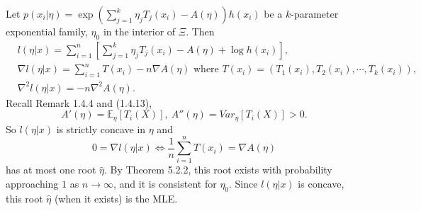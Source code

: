 \documentclass[a4paper]{article}
\begin{document}
\begin{eg}
	Let $p(x_i|\eta) = \exp(\sum\limits_{j=1}^k \eta_j T_j(x_i) - A(\eta)) h(x_i)$ be a $k$-parameter exponential family, $\eta_0$ in the interior of $\Xi$. Then
	\begin{equation*}
		\begin{aligned}
			& l(\eta|x) = \sum\limits_{i=1}^n\left[\sum\limits_{j=1}^k \eta_j T_j(x_i) - A(\eta) + \log h(x_i)\right], \\
			& \nabla l(\eta|x) = \sum\limits_{i=1}^n T(x_i) - n \nabla A(\eta) \text{ where } T(x_i) = (T_1(x_i),T_2(x_i),\cdots,T_k(x_i)), \\
			& \nabla^2 l(\eta|x) = -n \nabla^2 A(\eta).
		\end{aligned}
	\end{equation*}
	Recall Remark 1.4.4 and (1.4.13),
	\begin{equation*}
		A'(\eta) = \mathbb{E}_{\eta}[T_i(X)], \ A''(\eta) = Var_{\eta}[T_i(X)] > 0.
	\end{equation*}
	So $l(\eta|x)$ is strictly concave in $\eta$ and
	\begin{equation*}
		0 = \nabla l(\eta|x) \iff \frac{1}{n}\sum\limits_{i=1}^n T(x_i) = \nabla A(\eta)
	\end{equation*}
	has at most one root $\hat{\eta}$. By Theorem 5.2.2, this root exists with probability approaching $1$ as $n \to \infty$, and it is consistent for $\eta_0$. Since $l(\eta|x)$ is concave, this root $\hat{\eta}$ (when it exists) is the MLE.
\end{eg}
\end{document}
